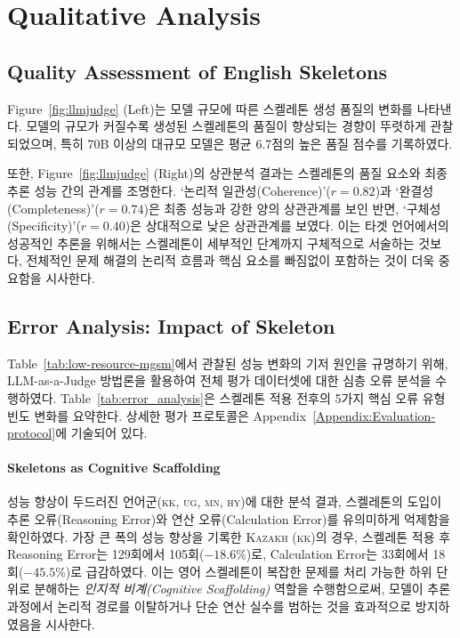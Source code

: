 \section{Qualitative Analysis}
\label{Appendix:skeleton_qualtiative}
\subsection{Quality Assessment of English Skeletons}

Figure~\ref{fig:llmjudge} (Left)는 모델 규모에 따른 스켈레톤 생성 품질의 변화를 나타낸다. 모델의 규모가 커질수록 생성된 스켈레톤의 품질이 향상되는 경향이 뚜렷하게 관찰되었으며, 특히 70B 이상의 대규모 모델은 평균 6.7점의 높은 품질 점수를 기록하였다. 

또한, Figure~\ref{fig:llmjudge} (Right)의 상관분석 결과는 스켈레톤의 품질 요소와 최종 추론 성능 간의 관계를 조명한다. `논리적 일관성(Coherence)'($r=0.82$)과 `완결성(Completeness)'($r=0.74$)은 최종 성능과 강한 양의 상관관계를 보인 반면, `구체성(Specificity)'($r=0.40$)은 상대적으로 낮은 상관관계를 보였다. 이는 타겟 언어에서의 성공적인 추론을 위해서는 스켈레톤이 세부적인 단계까지 구체적으로 서술하는 것보다, 전체적인 문제 해결의 논리적 흐름과 핵심 요소를 빠짐없이 포함하는 것이 더욱 중요함을 시사한다.



\subsection{Error Analysis: Impact of Skeleton}
Table~\ref{tab:low-resource-mgsm}에서 관찰된 성능 변화의 기저 원인을 규명하기 위해, LLM-as-a-Judge 방법론을 활용하여 전체 평가 데이터셋에 대한 심층 오류 분석을 수행하였다. Table~\ref{tab:error_analysis}은 스켈레톤 적용 전후의 5가지 핵심 오류 유형 빈도 변화를 요약한다. 상세한 평가 프로토콜은 Appendix~\ref{Appendix:Evaluation-protocol}에 기술되어 있다.

\paragraph{Skeletons as Cognitive Scaffolding}
성능 향상이 두드러진 언어군(\textsc{kk, ug, mn, hy})에 대한 분석 결과, 스켈레톤의 도입이 추론 오류(Reasoning Error)와 연산 오류(Calculation Error)를 유의미하게 억제함을 확인하였다.
가장 큰 폭의 성능 향상을 기록한 \textsc{Kazakh (kk)}의 경우, 스켈레톤 적용 후 Reasoning Error는 129회에서 105회($-18.6\%$)로, Calculation Error는 33회에서 18회($-45.5\%$)로 급감하였다.
이는 영어 스켈레톤이 복잡한 문제를 처리 가능한 하위 단위로 분해하는 \textit{인지적 비계(Cognitive Scaffolding)} 역할을 수행함으로써, 모델이 추론 과정에서 논리적 경로를 이탈하거나 단순 연산 실수를 범하는 것을 효과적으로 방지하였음을 시사한다.

